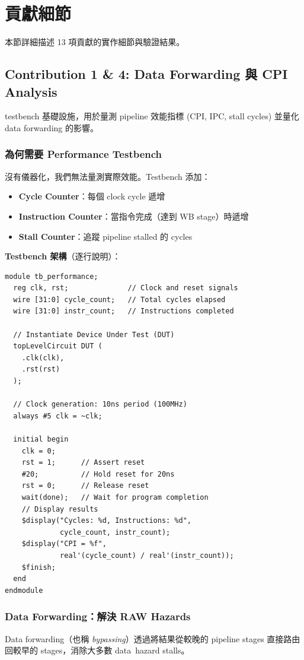 \documentclass[journal]{IEEEtran}
\newcommand{\tagit}[1]{\textit{#1}}
\newcommand{\Goal}{\tagit{目標：}}
\begin{document}
\section{貢獻細節}

本節詳細描述 13 項貢獻的實作細節與驗證結果。

\subsection{Contribution 1 \& 4: Data Forwarding 與 CPI Analysis}
 testbench 基礎設施，用於量測 pipeline 效能指標 (CPI, IPC, stall cycles) 並量化 data forwarding 的影響。

\subsubsection{為何需要 Performance Testbench}
沒有儀器化，我們無法量測實際效能。Testbench 添加：
\begin{itemize}
    \item \textbf{Cycle Counter}：每個 clock cycle 遞增
    \item \textbf{Instruction Counter}：當指令完成（達到 WB stage）時遞增
    \item \textbf{Stall Counter}：追蹤 pipeline stalled 的 cycles
\end{itemize}

\textbf{Testbench 架構}（逐行說明）：
\begin{lstlisting}
module tb_performance;
  reg clk, rst;              // Clock and reset signals
  wire [31:0] cycle_count;   // Total cycles elapsed
  wire [31:0] instr_count;   // Instructions completed
  
  // Instantiate Device Under Test (DUT)
  topLevelCircuit DUT (
    .clk(clk), 
    .rst(rst)
  );
  
  // Clock generation: 10ns period (100MHz)
  always #5 clk = ~clk;
  
  initial begin
    clk = 0;
    rst = 1;      // Assert reset
    #20;          // Hold reset for 20ns
    rst = 0;      // Release reset
    wait(done);   // Wait for program completion
    // Display results
    $display("Cycles: %d, Instructions: %d", 
             cycle_count, instr_count);
    $display("CPI = %f", 
             real'(cycle_count) / real'(instr_count));
    $finish;
  end
endmodule
\end{lstlisting}

\subsubsection{Data Forwarding：解決 RAW Hazards}
Data forwarding（也稱 \textit{bypassing}）透過將結果從較晚的 pipeline stages 直接路由回較早的 stages，消除大多數 data~hazard stalls。
\end{document}
